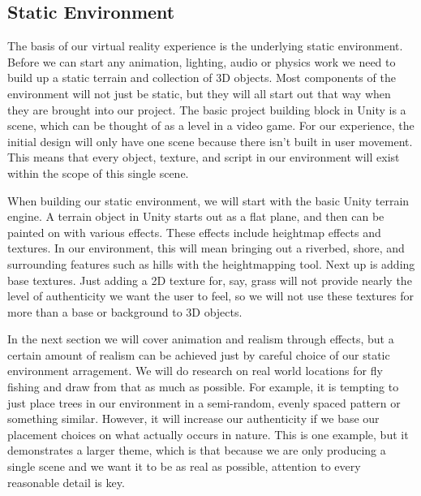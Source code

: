 \documentclass[10pt,journal,compsoc,onecolumn, draftclsnofoot]{IEEEtran}
\begin{document}
\subsection{Static Environment}
The basis of our virtual reality experience is the underlying static
environment. Before we can start any animation, lighting, audio or physics
work we need to build up a static terrain and collection of 3D objects.
Most components of the environment will not just be static, but they will all
start out that way when they are brought into our project. The basic project
building block in Unity is a scene, which can be thought of as a level in a
video game. \cite{microsoft_mag} For our experience, the initial design will
only have one scene because there isn't built in user movement. This means that
every object, texture, and script in our environment will exist within the
scope of this single scene.

When building our static environment, we will start with the basic Unity
terrain engine. A terrain object in Unity starts out as a flat plane, and then
can be painted on with various effects. \cite{unity_man_terrain} These effects
include heightmap effects and textures. In our environment, this will mean
bringing out a riverbed, shore, and surrounding features such as hills with the
heightmapping tool. Next up is adding base textures. Just adding a 2D texture
for, say, grass will not provide nearly the level of authenticity we want the
user to feel, so we will not use these textures for more than a base or
background to 3D objects.

In the next section we will cover animation and realism through effects, but
a certain amount of realism can be achieved just by careful choice of our
static environment arragement. We will do research on real world locations for
fly fishing and draw from that as much as possible. For example, it is tempting
to just place trees in our environment in a semi-random, evenly spaced pattern
or something similar. However, it will increase our authenticity if we base our
placement choices on what actually occurs in nature. This is one example, but
it demonstrates a larger theme, which is that because we are only producing a
single scene and we want it to be as real as possible, attention to every
reasonable detail is key.
\end{document}
